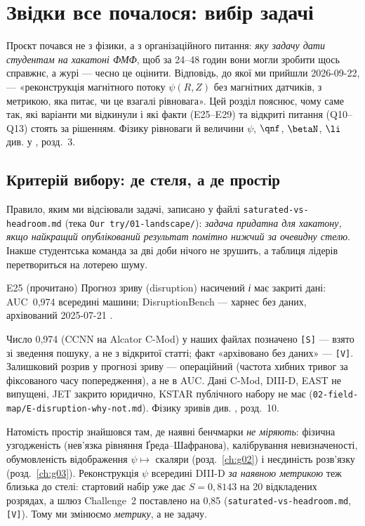 \chapter{Звідки все почалося: вибір задачі}\label{ch:g01}

Проєкт почався не з фізики, а з організаційного питання: \emph{яку задачу дати студентам
на хакатоні ФМФ}, щоб за 24--48 годин вони могли зробити щось справжнє, а журі --- чесно
це оцінити. Відповідь, до якої ми прийшли 2026-09-22, --- «реконструкція магнітного
потоку $\psi(R,Z)$ без магнітних датчиків, з метрикою, яка питає, чи це взагалі
рівновага». Цей розділ пояснює, чому саме так, які варіанти ми відкинули і які факти
(E25--E29) та відкриті питання (Q10--Q13) стоять за рішенням. Фізику рівноваги й
величини $\psi$, $\qnf$, $\betaN$, $\li$ див. у \cite{Manual}, розд.~3.

\section{Критерій вибору: де стеля, а де простір}\label{sec:g01-criterion}

Правило, яким ми відсіювали задачі, записано у файлі \texttt{saturated-vs-headroom.md} (тека
\texttt{Our try/01-landscape/}): \emph{задача придатна для хакатону, якщо найкращий
опублікований результат помітно нижчий за очевидну стелю}. Інакше студентська команда за
дві доби нічого не зрушить, а таблиця лідерів перетвориться на лотерею шуму.

\begin{established}{E25 (прочитано)}
Прогноз зриву (disruption) насичений \emph{і} має закриті дані: AUC~0,974 всередині машини;
DisruptionBench --- харнес без даних, архівований 2025-07-21 \cite{RegEst,Spangher2025}.
\end{established}
\noindent Число 0,974 (CCNN на Alcator C-Mod) у наших файлах позначено \texttt{[S]} --- взято зі
зведення пошуку, а не з відкритої статті; факт «архівовано без даних» --- \texttt{[V]}.
Залишковий розрив у прогнозі зриву --- операційний (частота хибних тривог за фіксованого часу
попередження), а не в AUC. Дані C-Mod, DIII-D, EAST не випущені, JET закрито юридично,
KSTAR публічного набору не має (\texttt{02-field-map/E-disruption-why-not.md}). Фізику
зривів див. \cite{Manual}, розд.~10.

Натомість простір знайшовся там, де наявні бенчмарки \emph{не міряють}: фізична
узгодженість (нев'язка рівняння Ґреда--Шафранова), калібрування невизначеності,
обумовленість відображення $\psi\mapsto$ скаляри (розд.~\ref{ch:g02}) і неєдиність
розв'язку (розд.~\ref{ch:g03}). Реконструкція $\psi$ всередині DIII-D \emph{за наявною
метрикою} теж близька до стелі: стартовий набір уже дає $S=0{,}8143$ на 20 відкладених
розрядах, а шлюз Challenge~2 поставлено на 0,85 (\texttt{saturated-vs-headroom.md}, \texttt{[V]}).
Тому ми змінюємо \emph{метрику}, а не задачу.

